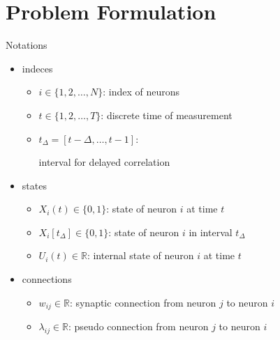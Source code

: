 \documentclass[fleqn,aspectratio=1610]{beamer}
\begin{document}
\section{Problem Formulation}
\label{sec:orgaf61d78}
\begin{frame}[label={sec:org94457ae}]{Notations}
\begin{itemize}
\item indeces
\begin{itemize}
\item \(i\in\{1,2,\dotsc,N\}\):
index of neurons
\item \(t\in\{1,2,\dotsc,T\}\):
discrete time of measurement
\item \(t_{\Delta}=[t-\Delta,\dotsc,t-1]\):

interval for delayed correlation
\end{itemize}
\item states
\begin{itemize}
\item \(X_{i}(t)\in\{0,1\}\):
state of neuron \(i\) at time \(t\)
\item \(X_{i}[t_{\Delta}]\in\{0,1\}\):
state of neuron \(i\) in interval \(t_{\Delta}\)
\item \(U_{i}(t)\in\mathbb{R}\):
internal state of neuron \(i\) at time \(t\)
\end{itemize}
\item connections
\begin{itemize}
\item \(w_{ij}\in\mathbb{R}\):
synaptic connection from neuron \(j\) to neuron \(i\)
\item \(\lambda_{ij}\in\mathbb{R}\):
pseudo connection from neuron \(j\) to neuron \(i\)
\end{itemize}
\end{itemize}
\end{frame}
\end{document}
